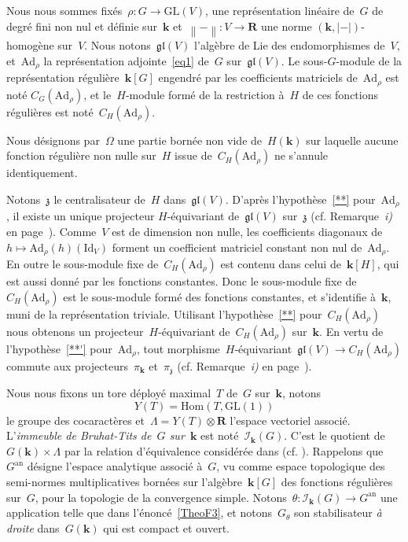 \documentclass[french]{amsart}
\newcommand{\kk}{\mathbf{k}}
\newcommand{\abs}[1]{{\left|{#1}\right|}}
\newcommand{\Ik}{\mathscr{I}_\kk}
\newcommand{\an}{\textrm{an}}
\newcommand{\GL}{\mathrm{GL}}
\newcommand{\Ad}{\mathrm{Ad}}
\newcommand{\lie}[1]{{\mathfrak{#1}}}
\newcommand{\gl}{\lie{gl}}
\newcommand{\Id}{\mathrm{Id}}
\newcommand{\Nm}[1]{{\left\|{#1}\right\|}}
\newcommand{\R}{\mathbf{R}}
\newcommand{\z}{\lie{z}}
\newcommand{\Hom}{\mathrm{Hom}}
\newcommand{\tens}{\mathop{\otimes}}
\begin{document}
Nous nous sommes fixés~$\rho : G \rightarrow \GL(V )$, une représentation linéaire de~$G$ de degré fini non nul et définie sur~$\kk$ et~$\Nm{-} : V \rightarrow \R$ une norme $(\kk,\abs{-})$-homogène sur~$V$. Nous notons~$\gl(V )$ l'algèbre de Lie des endomorphismes de~$V$, et~$\Ad_\rho$ la
représentation adjointe~\eqref{eq1} de~$G$ sur~$\gl(V )$. Le sous-$G$-module de la représentation régulière~$\kk[G]$ engendré par les coefficients matriciels de~$\Ad_\rho$ est noté $C_G(\Ad_\rho)$, et le~$H$-module formé de
la restriction à~$H$ de ces fonctions régulières est noté~$C_H(\Ad_\rho)$.

Nous désignons par~$\Omega$ une partie bornée non vide de~$H(\kk)$ sur laquelle aucune
fonction régulière non nulle sur~$H$ issue de~$C_H(\Ad_\rho)$ ne s'annule identiquement.

Notons~$\z$ le centralisateur de~$H$ dans~$\gl(V )$. D'après l'hypothèse~\eqref{**} pour~$\Ad_\rho$, il existe un unique projecteur $H$-équivariant de~$\gl(V )$ sur~$\z$ (cf. Remarque~\emph{i)} en page~\pageref{Remarquei}).
Comme~$V$ est de dimension non nulle, les coefficients diagonaux de~$h\mapsto \Ad_\rho(h)(\Id_V )$ forment un coefficient matriciel constant non nul de~$\Ad_\rho$. En outre le sous-module fixe de~$C_H(\Ad_\rho)$ est contenu dans celui de~$\kk[H]$, qui est aussi donné par les fonctions constantes. Donc le sous-module fixe de~$C_H(\Ad_\rho)$ est le sous-module formé des fonctions
constantes, et s'identifie à~$\kk$, muni de la représentation triviale. Utilisant l'hypothèse~\eqref{**} pour~$C_H(\Ad_\rho)$ nous obtenons un projecteur~$H$-équivariant de~$C_H(\Ad_\rho)$ sur~$\kk$. En vertu de l'hypothèse~\eqref{**'} pour~$\Ad_\rho$, tout morphisme~$H$-équivariant~$\gl(V)\rightarrow C_H(\Ad_\rho)$ commute aux projecteurs~$\pi_\kk$ et~$\pi_\z$ (cf. Remarque~\emph{i)} en page~\pageref{Remarquei}).

Nous nous fixons un tore déployé maximal~$T$ de~$G$ sur~$\kk$, notons
\begin{equation*}
Y(T)=\Hom(T,\GL(1))
\end{equation*}
le groupe des cocaractères et~$\Lambda=Y(T)\tens\R$ l'espace vectoriel associé. L'\emph{immeuble de Bruhat-Tits de~$G$ sur~$\kk$} est noté~$\Ik(G)$.
C'est le quotient de~$G(\kk) \times \Lambda$ par la relation d'équivalence considérée dans \cite[(1.3.2)]{RTW09} (cf. \cite[2.1]{Tit79}).
Rappelons que~$G^\an$ désigne l'espace analytique associé à~$G$, vu comme espace topologique des semi-normes multiplicatives bornées sur l'algèbre~$\kk[G]$ des fonctions régulières sur~$G$, pour la topologie de la convergence simple. Notons~$\theta:\Ik(G)\rightarrow G^\an$ une application telle que dans l'énoncé~\ref{TheoF3}, et notons~$G_\theta$ son stabilisateur \emph{à droite} dans~$G(\kk)$ qui est compact et ouvert.
\end{document}

